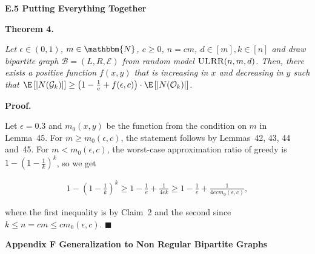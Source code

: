 \par\medskip\noindent\textbf{E.5 Putting Everything Together}\par





\par\medskip\noindent\textbf{\textbf{Theorem 4}\textbf{.}}\par



\emph{Let $\epsilon\in(0,1)$, $m\in\mathbbm{N}$, $c\geq 0$, $n=cm$, $d\in[m],k\in[n]$ and draw bipartite graph $\mathcal{B}=(L,R,\mathcal{E})$ from random model $\textsc{ULRR}(n,m,d)$.
Then, there exists a positive function $f(x,y)$ that is increasing in $x$ and decreasing in $y$ such that $\E\left[|N(\mathcal{G}_{k})|\right]\geq\left(1-\frac{1}{e}+f(\epsilon,c)\right)\cdot\E\left[|N(\mathcal{O}_{k})|\right]$.}\par






\par\medskip\noindent\textbf{Proof.}\par



Let $\epsilon=0.3$ and $m_{0}(x,y)$ be the function from the condition on $m$ in Lemma 45.
For $m\geq m_{0}(\epsilon,c)$, the statement follows by Lemmas 42, 43, 44 and 45.
For $m<m_{0}(\epsilon,c)$, the worst-case approximation ratio of greedy is $1-\left(1-\frac{1}{k}\right)^{k}$, so we get\par


\[\begin{gathered}
\displaystyle 1-\left(1-\frac{1}{k}\right)^{k}\geq 1-\frac{1}{e}+\frac{1}{4ek}\geq 1-\frac{1}{e}+\frac{1}{4ecm_{0}(\epsilon,c)},
\end{gathered}\]


where the first inequality is by Claim 2 and the second since $k\leq n=cm\leq cm_{0}(\epsilon,c)$.
\ensuremath{\blacksquare}\par







\par\medskip\noindent\textbf{Appendix F Generalization to Non Regular Bipartite Graphs}\par




